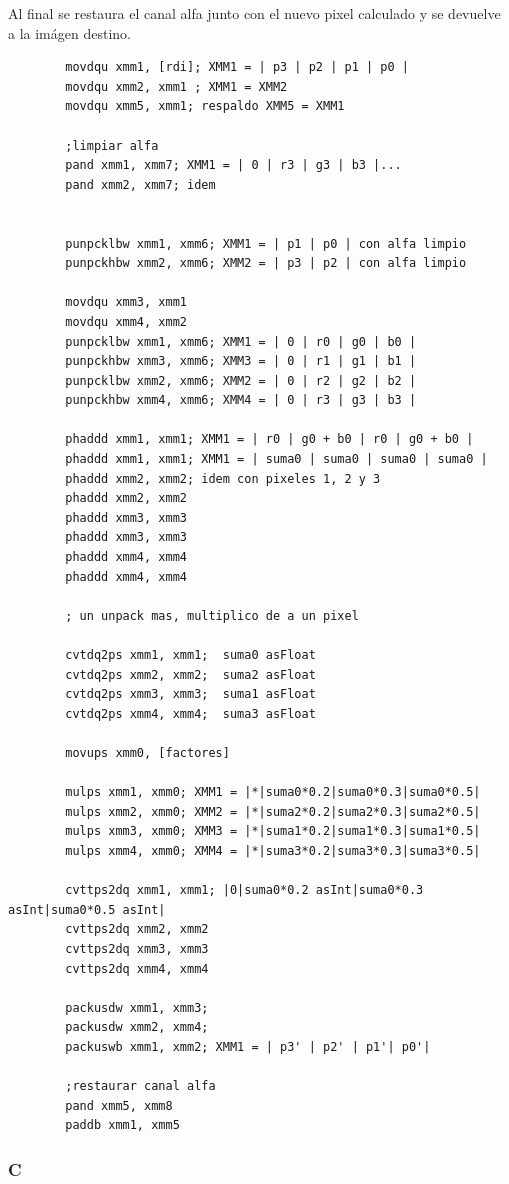 Al final se restaura el canal alfa junto con el nuevo pixel calculado y se devuelve a la imágen destino. 

\begin{codesnippet}
\begin{verbatim}
		movdqu xmm1, [rdi]; XMM1 = | p3 | p2 | p1 | p0 |
		movdqu xmm2, xmm1 ; XMM1 = XMM2
		movdqu xmm5, xmm1; respaldo XMM5 = XMM1

		;limpiar alfa
		pand xmm1, xmm7; XMM1 = | 0 | r3 | g3 | b3 |...
		pand xmm2, xmm7; idem
			
			
		punpcklbw xmm1, xmm6; XMM1 = | p1 | p0 | con alfa limpio
		punpckhbw xmm2, xmm6; XMM2 = | p3 | p2 | con alfa limpio
		
		movdqu xmm3, xmm1
		movdqu xmm4, xmm2
		punpcklbw xmm1, xmm6; XMM1 = | 0 | r0 | g0 | b0 |
		punpckhbw xmm3, xmm6; XMM3 = | 0 | r1 | g1 | b1 |
		punpcklbw xmm2, xmm6; XMM2 = | 0 | r2 | g2 | b2 |
		punpckhbw xmm4, xmm6; XMM4 = | 0 | r3 | g3 | b3 |
		
		phaddd xmm1, xmm1; XMM1 = | r0 | g0 + b0 | r0 | g0 + b0 |
		phaddd xmm1, xmm1; XMM1 = | suma0 | suma0 | suma0 | suma0 | 
		phaddd xmm2, xmm2; idem con pixeles 1, 2 y 3
		phaddd xmm2, xmm2
		phaddd xmm3, xmm3 
		phaddd xmm3, xmm3
		phaddd xmm4, xmm4
		phaddd xmm4, xmm4

		; un unpack mas, multiplico de a un pixel

		cvtdq2ps xmm1, xmm1;  suma0 asFloat
		cvtdq2ps xmm2, xmm2;  suma2 asFloat
		cvtdq2ps xmm3, xmm3;  suma1 asFloat
		cvtdq2ps xmm4, xmm4;  suma3 asFloat

		movups xmm0, [factores]

		mulps xmm1, xmm0; XMM1 = |*|suma0*0.2|suma0*0.3|suma0*0.5|  
		mulps xmm2, xmm0; XMM2 = |*|suma2*0.2|suma2*0.3|suma2*0.5|  
		mulps xmm3, xmm0; XMM3 = |*|suma1*0.2|suma1*0.3|suma1*0.5|   
		mulps xmm4, xmm0; XMM4 = |*|suma3*0.2|suma3*0.3|suma3*0.5|   

		cvttps2dq xmm1, xmm1; |0|suma0*0.2 asInt|suma0*0.3 asInt|suma0*0.5 asInt|
		cvttps2dq xmm2, xmm2
		cvttps2dq xmm3, xmm3
		cvttps2dq xmm4, xmm4

		packusdw xmm1, xmm3; 
		packusdw xmm2, xmm4;
		packuswb xmm1, xmm2; XMM1 = | p3' | p2' | p1'| p0'|

		;restaurar canal alfa
		pand xmm5, xmm8
		paddb xmm1, xmm5
\end{verbatim}
\end{codesnippet}

\subsubsection{C}

